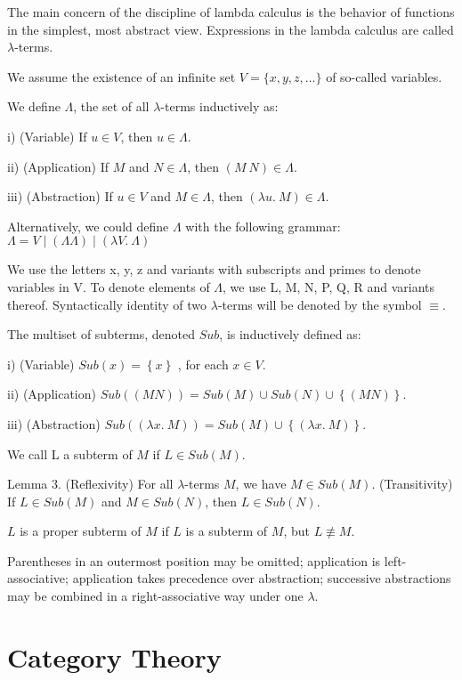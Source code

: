 {\color{red}

The main concern of the discipline of lambda calculus is the behavior of functions in the simplest, most abstract view.
Expressions in the lambda calculus are called $\lambda$-terms.

We assume the existence of an infinite set $V=\{x,y,z,\ldots\}$ of so-called variables.

\begin{definition}
We define $\Lambda$, the set of all $\lambda$-terms inductively as:

i) (Variable) If $u\in V$, then $u\in\Lambda$.

ii) (Application) If $M$ and $N\in\Lambda$, then $\left(M\:N\right)\in\Lambda$.

iii) (Abstraction) If $u\in V$ and $M\in\Lambda$, then $\left(\lambda u.\:M\right)\in\Lambda$.
\end{definition}

Alternatively, we could define $\Lambda$ with the following grammar:$\Lambda=V\mid\left(\Lambda\Lambda\right)\mid\left(\lambda V.\:\Lambda\right)$

We use the letters x, y, z and variants with subscripts and primes to denote variables in V. To denote elements of $\Lambda$, we use L, M, N, P, Q, R
and variants thereof. Syntactically identity of two $\lambda$-terms will be denoted by the symbol $\equiv$.

\begin{definition}
The multiset of subterms, denoted $Sub$, is inductively defined as:

i) (Variable) $Sub\left(x\right)=\left\{ x\right\}$ , for each $x\in V$.

ii) (Application) $Sub\left(\left(MN\right)\right)=Sub\left(M\right)\cup Sub\left(N\right)\cup\left\{ \left(MN\right)\right\}$.

iii) (Abstraction) $Sub\left(\left(\lambda x.\:M\right)\right)=Sub\left(M\right)\cup\left\{ \left(\lambda x.\:M\right)\right\}$.
\end{definition}

We call L a subterm of $M$ if $L\in Sub\left(M\right)$.

Lemma 3. (Reflexivity) For all $\lambda$-terms $M$, we have $M\in Sub\left(M\right)$.
(Transitivity) If $L\in Sub\left(M\right)$ and $M\in Sub\left(N\right)$, then $L\in Sub\left(N\right)$.

\begin{definition}
$L$ is a proper subterm of $M$ if $L$ is a subterm of $M$, but $L\not\equiv M$.
\end{definition}

Parentheses in an outermost position may be omitted; application is left-associative; application takes precedence over abstraction;
successive abstractions may be combined in a right-associative way under one $\lambda$.

}


%
%
\section{Category Theory}


